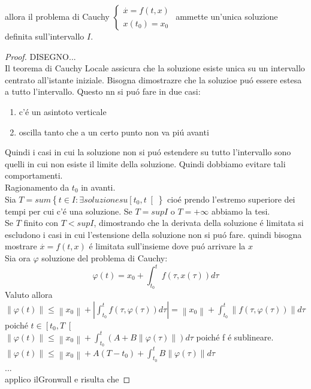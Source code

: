 allora il problema di Cauchy $\left\{\begin{matrix}\overset{\cdot}{x}=f(t,x)\\x(t_0)=x_0\end{matrix}\right.$ ammette un'unica soluzione definita sull'intervallo $I$.
\begin{proof}
	DISEGNO...\\
	Il teorema di Cauchy Locale assicura che  la soluzione esiste unica su un intervallo centrato all'istante iniziale.
	Bisogna dimostrazre che la soluzioe pu\'o essere estesa a tutto l'intervallo. Questo nn si pu\'o fare in due casi:
	\begin{enumerate}
		\item c'\'e un asintoto verticale
		\item oscilla tanto che a un certo punto non va pi\'u avanti
	\end{enumerate}
	Quindi i casi in cui la soluzione non si pu\'o estendere su tutto l'intervallo sono quelli in cui non esiste il limite della soluzione. Quindi dobbiamo evitare tali comportamenti.\\
	Ragionamento da $t_0$ in avanti.\\
	Sia $T=sum\left\{t\in I :\exists soluzione su \left[ t_0,t \right[ \right\}$ cio\'e prendo l'estremo superiore dei tempi per cui c'\'e una soluzione.
	Se $T= sup I$ o $T=+\infty$ abbiamo la tesi.\\
	Se $T$ finito con $T<sup I$, dimostrando che la derivata della soluzione \'e limitata si escludono i casi in cui l'estensione della soluzione non si pu\'o fare.
	quindi bisogna mostrare $\overset{\cdot}{x} = f(t,x)$ \'e limitata sull'insieme dove pu\'o arrivare la $x$\\
	Sia ora $\varphi$ soluzione del problema di Cauchy:
	$$ \varphi(t) = x_0 + \int_{t_0}^tf(\tau,x(\tau))d\tau$$
	Valuto allora\\
	$\left\|\varphi(t)\right\|\le \left\|x_0\right\| + \left|\int_{t_0}^tf(\tau,\varphi(\tau))d\tau\right|=\left\|x_0\right\| + \int_{t_0}^t\left\|f(\tau,\varphi(\tau))\right\|d\tau$ poich\'e $t\in\left[t_0,T\right[$\\
	$\left\|\varphi(t)\right\|\le \left\|x_0\right\| + \int_{t_0}^t\left(A+B\left\|\varphi(\tau)\right\|\right)d\tau$ poich\'e f \'e sublineare.\\
	$\left\|\varphi(t)\right\|\le \left\|x_0\right\| + A(T-t_0)+\int_{t_0}^t B\left\|\varphi(\tau)\right\|d\tau$\\
	...\\
	applico ilGronwall e risulta che

\end{proof}
